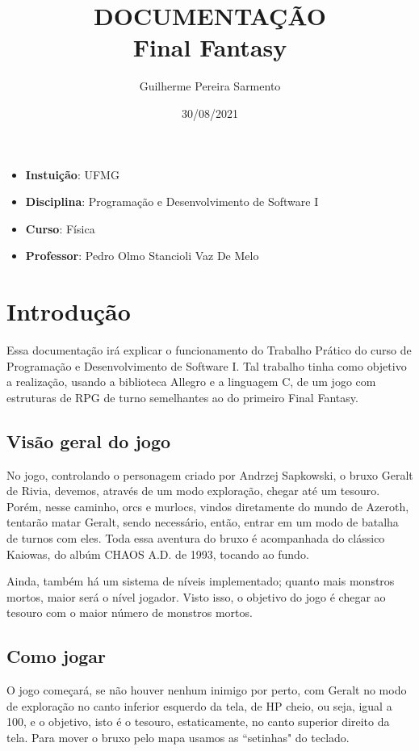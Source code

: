 \documentclass[a4paper, 12pt]{article}
\title{ 
DOCUMENTAÇÃO \\ 
Final Fantasy}
\author{Guilherme Pereira Sarmento}
\date{30/08/2021}
\begin{document}
\maketitle
\begin{itemize}
\item \textbf{Instuição}: UFMG

\item \textbf{Disciplina}: Programação e Desenvolvimento de Software I 

\item \textbf{Curso}: Física

\item \textbf{Professor}: Pedro Olmo Stancioli Vaz De Melo 
\end{itemize}

\section{Introdução}


  Essa documentação irá explicar o funcionamento do Trabalho Prático do curso de Programação e Desenvolvimento de Software I. Tal trabalho tinha como objetivo a realização, usando a biblioteca Allegro e a linguagem C, de um jogo com estruturas de RPG de turno semelhantes ao do primeiro Final Fantasy.

\subsection{Visão geral do jogo}

  No jogo, controlando o personagem criado por Andrzej Sapkowski, o bruxo Geralt de Rivia, devemos, através de um modo exploração, chegar até um tesouro. Porém, nesse caminho, orcs e murlocs, vindos diretamente do mundo de Azeroth, tentarão matar Geralt, sendo necessário, então, entrar em um modo de batalha de turnos com eles. Toda essa aventura do bruxo é acompanhada do clássico Kaiowas, do albúm CHAOS A.D. de 1993, tocando ao fundo.
  
  Ainda, também há um sistema de níveis implementado; quanto mais monstros mortos, maior será o nível jogador. Visto isso, o objetivo do jogo é chegar ao tesouro com o maior número de monstros mortos.
  
\subsection{Como jogar}

  O jogo começará, se não houver nenhum inimigo por perto, com Geralt no modo de exploração no canto inferior esquerdo da tela, de HP cheio, ou seja, igual a 100, e o objetivo, isto é o tesouro, estaticamente, no canto superior direito da tela. Para mover o bruxo pelo mapa usamos as ``setinhas" do teclado. 
  
\end{document}

